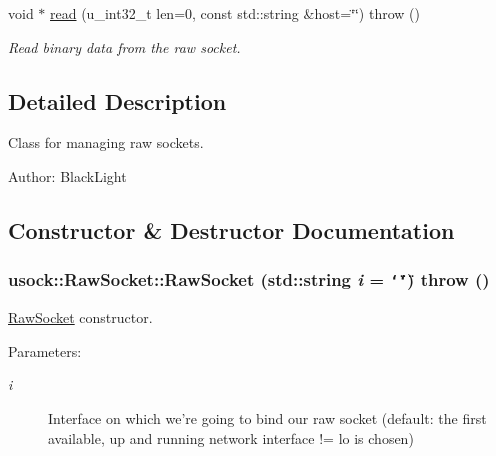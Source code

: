 \begin{CompactItemize}
void $\ast$ \hyperlink{classusock_1_1RawSocket_07bc901bc9b902122cca8a41f8c5c02a}{read} (u\_\-int32\_\-t len=0, const std::string \&host=\char`\"{}\char`\"{})  throw ()
\begin{CompactList}\small\item\em Read binary data from the raw socket. \item\end{CompactList}\end{CompactItemize}


\subsection{Detailed Description}
Class for managing raw sockets. 

\begin{Desc}
\item[Author:]BlackLight \end{Desc}


\subsection{Constructor \& Destructor Documentation}
\hypertarget{classusock_1_1RawSocket_4eb16f88edce4337c3df518465fd5566}{
\subsubsection[{RawSocket}]{\setlength{\rightskip}{0pt plus 5cm}usock::RawSocket::RawSocket (std::string {\em i} = {\tt \char`\"{}\char`\"{}})  throw ()}}
\label{classusock_1_1RawSocket_4eb16f88edce4337c3df518465fd5566}


\hyperlink{classusock_1_1RawSocket}{RawSocket} constructor. 

\begin{Desc}
\item[Parameters:]
\begin{description}
\item[{\em i}]Interface on which we're going to bind our raw socket (default: the first available, up and running network interface != lo is chosen) \end{description}
\end{Desc}


